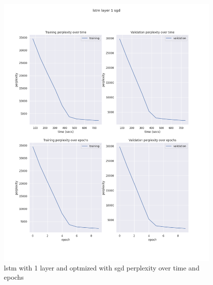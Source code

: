 \documentclass[12pt]{article}
\theoremstyle{definition}
\begin{document}
\begin{figure}[H]
     \centering
     \includegraphics[scale=0.4]{lstm_layer_1_sgd.png}
     \caption{lstm with 1 layer and optmized with sgd perplexity over time and epochs}
\end{figure}
\end{document}
